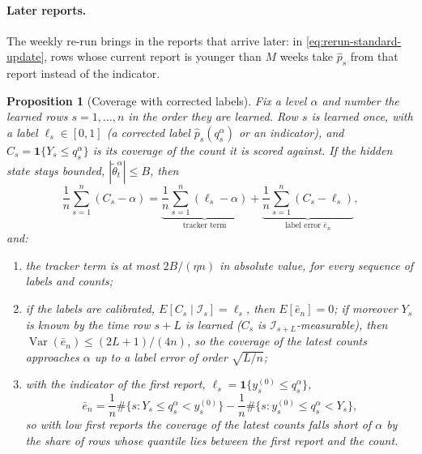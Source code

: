 \documentclass[11pt,a4paper]{article}
\newcommand{\ind}{\mathbf{1}}
\newtheorem{proposition}{Proposition}[section]
\theoremstyle{definition}
\theoremstyle{remark}
\begin{document}
\paragraph{Later reports.} The weekly re-run brings in the reports that
arrive later: in \eqref{eq:rerun-standard-update}, rows whose current
report is younger than $M$ weeks take $\hat p_s$ from that report instead
of the indicator.

\begin{proposition}[Coverage with corrected labels]
\label{prop:corrected-labels}
Fix a level $\alpha$ and number the learned rows $s=1,\dots,n$ in the
order they are learned. Row $s$ is learned once, with a label
$\ell_s\in[0,1]$ (a corrected label $\hat p_s(q_s^\alpha)$ or an
indicator), and $C_s=\ind\{Y_s\le q_s^\alpha\}$ is its coverage of the
count it is scored against. If the hidden state stays bounded,
$|\tilde\theta_t^\alpha|\le B$, then
\begin{equation}
 \frac1n\sum_{s=1}^n(C_s-\alpha)
 =\underbrace{\frac1n\sum_{s=1}^n(\ell_s-\alpha)}_{\text{tracker term}}
 +\underbrace{\frac1n\sum_{s=1}^n(C_s-\ell_s)}_{\text{label error }\bar e_n},
 \label{eq:corrected-decomposition}
\end{equation}
and:
\begin{enumerate}[label=(\alph*),leftmargin=*,itemsep=2pt]
\item the tracker term is at most $2B/(\eta n)$ in absolute value, for
every sequence of labels and counts;
\item if the labels are calibrated, $E[C_s\mid\mathcal I_s]=\ell_s$, then
$E[\bar e_n]=0$; if moreover $Y_s$ is known by the time row $s+L$ is
learned ($C_s$ is $\mathcal I_{s+L}$-measurable), then
$\operatorname{Var}(\bar e_n)\le(2L+1)/(4n)$, so the coverage of the
latest counts approaches $\alpha$ up to a label error of order
$\sqrt{L/n}$;
\item with the indicator of the first report,
$\ell_s=\ind\{y_s^{(0)}\le q_s^\alpha\}$,
\[
 \bar e_n=\frac1n\#\{s:Y_s\le q_s^\alpha<y_s^{(0)}\}
 -\frac1n\#\{s:y_s^{(0)}\le q_s^\alpha<Y_s\},
\]
so with low first reports the coverage of the latest counts falls short
of $\alpha$ by the share of rows whose quantile lies between the first
report and the count.
\end{enumerate}
\end{proposition}
\end{document}
